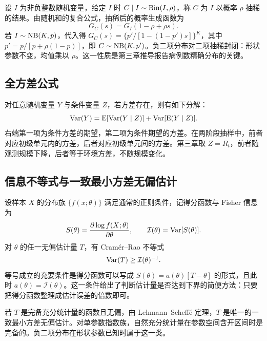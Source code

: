 设 $I$ 为非负整数随机变量，给定 $I$ 时 $C\mid I\sim\operatorname{Bin}(I,\rho)$，称 $C$ 为 $I$ 以概率 $\rho$ 抽稀的结果\citep{steutel1979discrete}。由随机和的复合公式，抽稀后的概率生成函数为
\begin{equation}
  G_C(s)=G_I(1-\rho+\rho s).
  \label{eq:thinning-pgf}
\end{equation}
若 $I\sim\operatorname{NB}(K,p)$，代入得 $G_C(s)=\{p'/[1-(1-p')s]\}^{K}$，其中 $p'=p/[p+\rho(1-p)]$，即 $C\sim\operatorname{NB}(K,p')$。负二项分布对二项抽稀封闭：形状参数不变，均值乘以 $\rho$。这一性质是第三章推导报告病例数精确分布的关键。

\subsection{全方差公式}

对任意随机变量 $Y$ 与条件变量 $Z$，若方差存在，则有如下分解：
\begin{equation}
  \operatorname{Var}(Y)=\operatorname{E}[\operatorname{Var}(Y\mid Z)]+\operatorname{Var}[\operatorname{E}(Y\mid Z)].
  \label{eq:total-variance}
\end{equation}
右端第一项为条件方差的期望，第二项为条件期望的方差。在两阶段抽样中，前者对应初级单元内的方差，后者对应初级单元间的方差\citep{cochran1977sampling, searle1992variance}。第三章取 $Z=R_t$，前者随观测规模下降，后者等于环境方差，不随规模变化。

\subsection{信息不等式与一致最小方差无偏估计}

设样本 $X$ 的分布族 $\{f(x;\theta)\}$ 满足通常的正则条件，记得分函数与 Fisher 信息为
\begin{equation*}
  S(\theta)=\frac{\partial\log f(X;\theta)}{\partial\theta},\qquad \mathcal{I}(\theta)=\operatorname{Var}[S(\theta)].
\end{equation*}
对 $\theta$ 的任一无偏估计量 $T$，有 Cramér--Rao 不等式\citep{rao1945information, cramer1946mathematical}
\begin{equation}
  \operatorname{Var}(T)\ge \mathcal{I}(\theta)^{-1}.
  \label{eq:crlb}
\end{equation}
等号成立的充要条件是得分函数可以写成 $S(\theta)=a(\theta)[T-\theta]$ 的形式，且此时 $a(\theta)=\mathcal{I}(\theta)$\citep{casella2002statistical}。这一条件给出了判断估计量是否达到下界的简便方法：只要把得分函数整理成估计误差的倍数即可。

若 $T$ 是完备充分统计量的函数且无偏，由 Lehmann--Scheff\'e 定理，$T$ 是唯一的一致最小方差无偏估计\citep{lehmann1998point}。对单参数指数族，自然充分统计量在参数空间含开区间时是完备的。负二项分布在形状参数已知时属于这一类。

